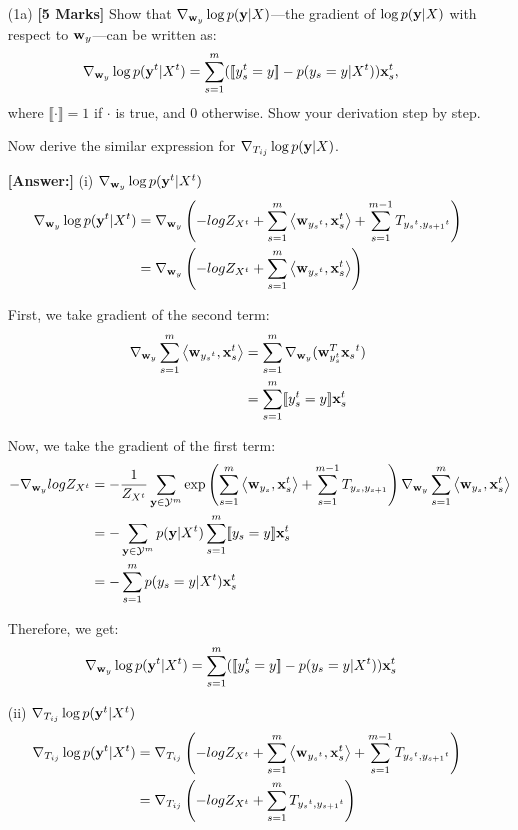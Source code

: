 \documentclass[11pt]{report}
\begin{document}
\begin{itemize}
	\item[(1a)] {\bf [5 Marks]} Show that ${\nabla}_{\mathbf{\boldsymbol{w}}_y} \log p(\mathbf{\boldsymbol{y}}|X)$---the gradient of $\log p(\mathbf{\boldsymbol{y}}|X)$ with respect to $\mathbf{\boldsymbol{w}}_y$---can be written as:
	\begin{align}
		{\nabla}_{\mathbf{\boldsymbol{w}}_y} \log p(\mathbf{\boldsymbol{y}}^t|X^t) &= \sum_{s=1}^m ([\![y^t_s = y]\!] - p(y_s = y | X^t)) \mathbf{\boldsymbol{x}}^t_s,
	\end{align}
	where $\llbracket \cdot \rrbracket = 1$ if $\cdot$ is true, and 0 otherwise.
	Show your derivation step by step.
	
	Now derive the similar expression for ${\nabla}_{T_{ij}} \log p(\mathbf{\boldsymbol{y}}|X)$.
	
	{\bf [Answer:]} 
	(i) ${\nabla}_{\mathbf{\boldsymbol{w}}_y} \log p(\mathbf{\boldsymbol{y}}^t|X^t)$
	\begin{align}
		{\nabla}_{\mathbf{\boldsymbol{w}}_y} \log p(\mathbf{\boldsymbol{y}}^t|X^t) &= {\nabla}_{\mathbf{\boldsymbol{w}}_y} \left(-logZ_{X^t} + \sum_{s=1}^m \left\langle \mathbf{\boldsymbol{w}}_{{y_s}^t},\mathbf{\boldsymbol{x}}_s^t \right\rangle + \sum_{s=1}^{m-1} T_{{y_s}^t, {y_{s+1}}^t}\right) \\ 
		&={\nabla}_{\mathbf{\boldsymbol{w}}_y} \left(-logZ_{X^t} + \sum_{s=1}^m \left\langle \mathbf{\boldsymbol{w}}_{{y_s}^t},\mathbf{\boldsymbol{x}}_s^t \right\rangle\right)
	\end{align}

	First, we take gradient of the second term: 
	\begin{align}
		{\nabla}_{\mathbf{\boldsymbol{w}}_y} \sum_{s=1}^m \left\langle \mathbf{\boldsymbol{w}}_{{y_s}^t},\mathbf{\boldsymbol{x}}_s^t \right\rangle &= \sum_{s=1}^m {\nabla}_{\mathbf{\boldsymbol{w}}_y} (\mathbf{\boldsymbol{w}}_{y_s^t}^T {{\mathbf{\boldsymbol{x}}_s}^t}) \\
		&= \sum_{s=1}^m [\![y^t_s = y]\!] \mathbf{\boldsymbol{x}}^t_s
	\end{align}

	Now, we take the gradient of the first term: 
	\begin{align}
		-{\nabla}_{\mathbf{\boldsymbol{w}}_y} logZ_{X^t} &= -\frac{1}{Z_{X^t}} \sum_{\mathbf{\boldsymbol{y}} \in \mathcal{Y}^m}\exp \left(\sum_{s=1}^m \left\langle \mathbf{\boldsymbol{w}}_{y_s},\mathbf{\boldsymbol{x}}_s^t \right\rangle + \sum_{s=1}^{m-1} T_{y_s, y_{s+1}}\right) {\nabla}_{\mathbf{\boldsymbol{w}}_y} \sum_{s=1}^m \left\langle \mathbf{\boldsymbol{w}}_{y_s},\mathbf{\boldsymbol{x}}_s^t \right\rangle \\
		&= -\sum_{\mathbf{\boldsymbol{y}} \in \mathcal{Y}^m}p(\mathbf{\boldsymbol{y}}|X^t) \sum_{s=1}^m [\![y_s = y]\!] \mathbf{\boldsymbol{x}}^t_s \\
		&= -\sum_{s=1}^m p(y_s = y|X^t)\mathbf{\boldsymbol{x}}^t_s
	\end{align}

	Therefore, we get: 
	\begin{align}
		{\nabla}_{\mathbf{\boldsymbol{w}}_y} \log p(\mathbf{\boldsymbol{y}}^t|X^t) &= \sum_{s=1}^m ([\![y^t_s = y]\!] - p(y_s = y | X^t)) \mathbf{\boldsymbol{x}}^t_s
	\end{align}

	(ii) ${\nabla}_{T_{ij}} \log p(\mathbf{\boldsymbol{y}}^t|X^t)$
	\begin{align}
		{\nabla}_{T_{ij}} \log p(\mathbf{\boldsymbol{y}}^t|X^t) &= {\nabla}_{T_{ij}} \left(-logZ_{X^t} + \sum_{s=1}^m \left\langle \mathbf{\boldsymbol{w}}_{{y_s}^t},\mathbf{\boldsymbol{x}}_s^t \right\rangle + \sum_{s=1}^{m-1} T_{{y_s}^t, {y_{s+1}}^t}\right) \\ 
		&={\nabla}_{T_{ij}} \left(-logZ_{X^t} + \sum_{s=1}^m T_{{y_s}^t, {y_{s+1}}^t}\right)
	\end{align}


\end{itemize}
\end{document}
